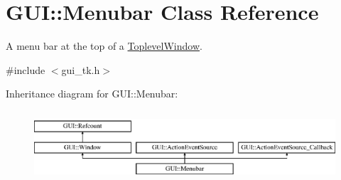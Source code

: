 \hypertarget{classGUI_1_1Menubar}{\section{G\-U\-I\-:\-:Menubar Class Reference}
\label{classGUI_1_1Menubar}
}


A menu bar at the top of a \hyperlink{classGUI_1_1ToplevelWindow}{Toplevel\-Window}.  




{\ttfamily \#include $<$gui\-\_\-tk.\-h$>$}

Inheritance diagram for G\-U\-I\-:\-:Menubar\-:\begin{figure}[H]
\begin{center}
\leavevmode
\includegraphics[height=2.654028cm]{classGUI_1_1Menubar}
\end{center}
\end{figure}
